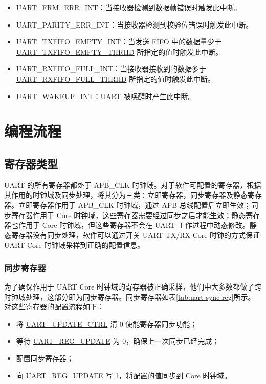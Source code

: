 \documentclass[main\_\_CN.tex]{subfiles}
\begin{document}
\begin{itemize}
\item \label{int:UARTFRMERRINT}UART\_FRM\_ERR\_INT：当接收器检测到数据帧错误时触发此中断。
\item \label{int:UARTPARITYERRINT}UART\_PARITY\_ERR\_INT：当接收器检测到校验位错误时触发此中断。
\item \label{int:UARTTXFIFOEMPTYINT}UART\_TXFIFO\_EMPTY\_INT：当发送 FIFO 中的数据量少于 \hyperref[fielddesc:UARTTXFIFOEMPTYTHRHD]{UART\_TXFIFO\_EMPTY\_THRHD} 所指定的值时触发此中断。
\item \label{int:UARTRXFIFOFULLINT}UART\_RXFIFO\_FULL\_INT：当接收器接收到的数据多于 \hyperref[fielddesc:UARTRXFIFOFULLTHRHD]{UART\_RXFIFO\_FULL\_THRHD} 所指定的值时触发此中断。
\item \label{int:UARTWAKEUPINT}UART\_WAKEUP\_INT：UART 被唤醒时产生此中断。
\end{itemize}


\section{编程流程}\label{sec:uart-program}

\subsection{寄存器类型}

UART 的所有寄存器都处于 APB\_CLK 时钟域。对于软件可配置的寄存器，根据其作用的时钟域及同步处理，将其分为三类：立即寄存器，同步寄存器及静态寄存器。立即寄存器作用于 APB\_CLK 时钟域，通过 APB 总线配置后立即生效；同步寄存器作用于 Core 时钟域，这些寄存器需要经过同步之后才能生效；静态寄存器也作用于 Core 时钟域，但这些寄存器不会在 UART 工作过程中动态修改。静态寄存器没有同步处理，软件可以通过开关 UART TX/RX Core 时钟的方式保证 UART Core 时钟域采样到正确的配置信息。

\subsubsection{同步寄存器}

为了确保作用于 UART Core 时钟域的寄存器被正确采样，他们中大多数都做了跨时钟域处理，这部分即为同步寄存器。同步寄存器如表\ref{tab:uart-sync-reg}所示。对这些寄存器的配置流程如下：

\begin{itemize}
    \item 将 \hyperref[fielddesc:UARTUPDATECTRL]{UART\_UPDATE\_CTRL} 清 0 使能寄存器同步功能；
    \item 等待 \hyperref[fielddesc:UARTREGUPDATE]{UART\_REG\_UPDATE} 为 0，确保上一次同步已经完成；
    \item 配置同步寄存器；
    \item 向 \hyperref[fielddesc:UARTREGUPDATE]{UART\_REG\_UPDATE} 写 1，将配置的值同步到 Core 时钟域。
\end{itemize}
\end{document}
